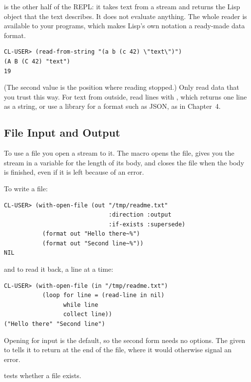  is the other half of the REPL: it takes text from a stream
and returns the Lisp object that the text describes. It does not
evaluate anything. The whole reader is available to your programs,
which makes Lisp's own notation a ready-made data format.

\begin{verbatim}
CL-USER> (read-from-string "(a b (c 42) \"text\")")
(A B (C 42) "text")
19
\end{verbatim}

\noindent
(The second value is the position where reading stopped.) Only read
data that you trust this way. For text from outside, read lines with
, which returns one line as a string, or use a
library for a format such as JSON, as in Chapter~4.

\subsection{File Input and Output}

To use a file you open a stream to it. The macro
 opens the file, gives you the stream in a
variable for the length of its body, and closes the file when the body
is finished, even if it is left because of an error.

To write a file:

\begin{verbatim}
CL-USER> (with-open-file (out "/tmp/readme.txt"
                              :direction :output
                              :if-exists :supersede)
           (format out "Hello there~%")
           (format out "Second line~%"))
NIL
\end{verbatim}

\noindent
and to read it back, a line at a time:

\begin{verbatim}
CL-USER> (with-open-file (in "/tmp/readme.txt")
           (loop for line = (read-line in nil)
                 while line
                 collect line))
("Hello there" "Second line")
\end{verbatim}

Opening for input is the default, so the second form needs no options.
The  given to  tells it to return
 at the end of the file, where it would otherwise signal
an error.

 tests whether a file exists.

